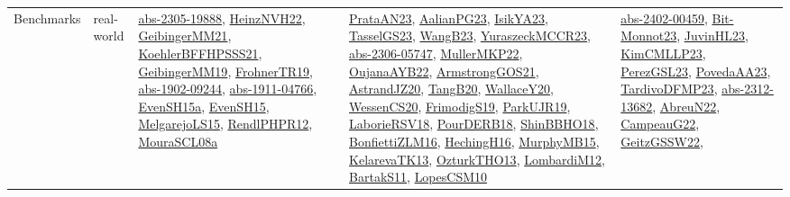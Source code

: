 {\begin{longtable}{lp{3cm}>{\raggedright}p{6cm}>{\raggedright}p{6cm}p{8cm}}
Benchmarks & real-world & \href{articles/abs-2305-19888.pdf}{abs-2305-19888}\cite{abs-2305-19888}, \href{articles/HeinzNVH22.pdf}{HeinzNVH22}\cite{HeinzNVH22}, \href{papers/GeibingerMM21.pdf}{GeibingerMM21}\cite{GeibingerMM21}, \href{articles/KoehlerBFFHPSSS21.pdf}{KoehlerBFFHPSSS21}\cite{KoehlerBFFHPSSS21}, \href{papers/GeibingerMM19.pdf}{GeibingerMM19}\cite{GeibingerMM19}, \href{papers/FrohnerTR19.pdf}{FrohnerTR19}\cite{FrohnerTR19}, \href{articles/abs-1902-09244.pdf}{abs-1902-09244}\cite{abs-1902-09244}, \href{articles/abs-1911-04766.pdf}{abs-1911-04766}\cite{abs-1911-04766}, \href{articles/EvenSH15a.pdf}{EvenSH15a}\cite{EvenSH15a}, \href{papers/EvenSH15.pdf}{EvenSH15}\cite{EvenSH15}, \href{papers/MelgarejoLS15.pdf}{MelgarejoLS15}\cite{MelgarejoLS15}, \href{papers/RendlPHPR12.pdf}{RendlPHPR12}\cite{RendlPHPR12}, \href{papers/MouraSCL08a.pdf}{MouraSCL08a}\cite{MouraSCL08a} & \href{articles/PrataAN23.pdf}{PrataAN23}\cite{PrataAN23}, \href{papers/AalianPG23.pdf}{AalianPG23}\cite{AalianPG23}, \href{articles/IsikYA23.pdf}{IsikYA23}\cite{IsikYA23}, \href{papers/TasselGS23.pdf}{TasselGS23}\cite{TasselGS23}, \href{papers/WangB23.pdf}{WangB23}\cite{WangB23}, \href{articles/YuraszeckMCCR23.pdf}{YuraszeckMCCR23}\cite{YuraszeckMCCR23}, \href{articles/abs-2306-05747.pdf}{abs-2306-05747}\cite{abs-2306-05747}, \href{articles/MullerMKP22.pdf}{MullerMKP22}\cite{MullerMKP22}, \href{papers/OujanaAYB22.pdf}{OujanaAYB22}\cite{OujanaAYB22}, \href{papers/ArmstrongGOS21.pdf}{ArmstrongGOS21}\cite{ArmstrongGOS21}, \href{articles/AstrandJZ20.pdf}{AstrandJZ20}\cite{AstrandJZ20}, \href{papers/TangB20.pdf}{TangB20}\cite{TangB20}, \href{articles/WallaceY20.pdf}{WallaceY20}\cite{WallaceY20}, \href{papers/WessenCS20.pdf}{WessenCS20}\cite{WessenCS20}, \href{papers/FrimodigS19.pdf}{FrimodigS19}\cite{FrimodigS19}, \href{papers/ParkUJR19.pdf}{ParkUJR19}\cite{ParkUJR19}, \href{articles/LaborieRSV18.pdf}{LaborieRSV18}\cite{LaborieRSV18}, \href{articles/PourDERB18.pdf}{PourDERB18}\cite{PourDERB18}, \href{articles/ShinBBHO18.pdf}{ShinBBHO18}\cite{ShinBBHO18}, \href{papers/BonfiettiZLM16.pdf}{BonfiettiZLM16}\cite{BonfiettiZLM16}, \href{papers/HechingH16.pdf}{HechingH16}\cite{HechingH16}, \href{papers/MurphyMB15.pdf}{MurphyMB15}\cite{MurphyMB15}, \href{papers/KelarevaTK13.pdf}{KelarevaTK13}\cite{KelarevaTK13}, \href{articles/OzturkTHO13.pdf}{OzturkTHO13}\cite{OzturkTHO13}, \href{articles/LombardiM12.pdf}{LombardiM12}\cite{LombardiM12}, \href{articles/BartakS11.pdf}{BartakS11}\cite{BartakS11}, \href{articles/LopesCSM10.pdf}{LopesCSM10}\cite{LopesCSM10} & \href{articles/abs-2402-00459.pdf}{abs-2402-00459}\cite{abs-2402-00459}, \href{papers/Bit-Monnot23.pdf}{Bit-Monnot23}\cite{Bit-Monnot23}, \href{papers/JuvinHL23.pdf}{JuvinHL23}\cite{JuvinHL23}, \href{papers/KimCMLLP23.pdf}{KimCMLLP23}\cite{KimCMLLP23}, \href{papers/PerezGSL23.pdf}{PerezGSL23}\cite{PerezGSL23}, \href{papers/PovedaAA23.pdf}{PovedaAA23}\cite{PovedaAA23}, \href{papers/TardivoDFMP23.pdf}{TardivoDFMP23}\cite{TardivoDFMP23}, \href{articles/abs-2312-13682.pdf}{abs-2312-13682}\cite{abs-2312-13682}, \href{articles/AbreuN22.pdf}{AbreuN22}\cite{AbreuN22}, \href{articles/CampeauG22.pdf}{CampeauG22}\cite{CampeauG22}, \href{papers/GeitzGSSW22.pdf}{GeitzGSSW22}\cite{GeitzGSSW22}, 
\end{longtable}}
